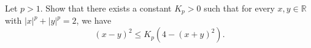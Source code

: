 Let $p>1$. Show that there exists a constant $K_{p} >0$ such that for every $x,y\in \mathbb{R}$
with $|x|^{p}+|y|^{p}=2$, we have
$$(x-y)^{2} \leq K_{p}(4-(x+y)^{2}).$$